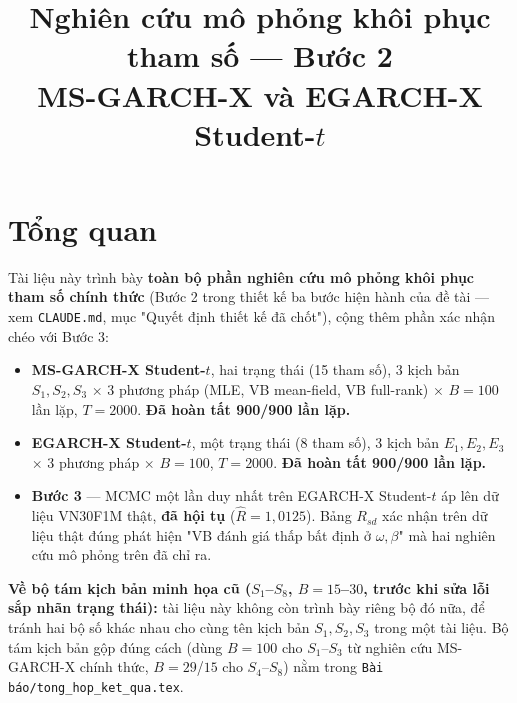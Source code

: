 \documentclass[11pt,a4paper]{article}
\title{\vspace{-1.2cm}\textbf{Nghiên cứu mô phỏng khôi phục tham số --- Bước 2}\\[0.25em]
\large MS-GARCH-X và EGARCH-X Student-$t$}
\author{}
\date{}
\begin{document}
\maketitle
\vspace{-1.4cm}

\section*{Tổng quan}
Tài liệu này trình bày \textbf{toàn bộ phần nghiên cứu mô phỏng khôi phục tham số
chính thức} (Bước 2 trong thiết kế ba bước hiện hành của đề tài --- xem
\texttt{CLAUDE.md}, mục "Quyết định thiết kế đã chốt"), cộng thêm phần xác
nhận chéo với Bước 3:

\begin{itemize}
\item \textbf{MS-GARCH-X Student-$t$}, hai trạng thái (15 tham số),
  3 kịch bản $S_1,S_2,S_3$ $\times$ 3 phương pháp (MLE, VB mean-field, VB
  full-rank) $\times$ $B=100$ lần lặp, $T=2000$. \textbf{Đã hoàn tất 900/900
  lần lặp.}
\item \textbf{EGARCH-X Student-$t$}, một trạng thái (8 tham số),
  3 kịch bản $E_1,E_2,E_3$ $\times$ 3 phương pháp $\times$ $B=100$, $T=2000$.
  \textbf{Đã hoàn tất 900/900 lần lặp.}
\item \textbf{Bước 3} --- MCMC một lần duy nhất trên EGARCH-X Student-$t$ áp
  lên dữ liệu VN30F1M thật, \textbf{đã hội tụ} ($\hat R=1{,}0125$). Bảng
  $R_{sd}$ xác nhận trên dữ liệu thật đúng phát hiện "VB đánh giá thấp bất
  định ở $\omega,\beta$" mà hai nghiên cứu mô phỏng trên đã chỉ ra.
\end{itemize}

\textbf{Về bộ tám kịch bản minh họa cũ ($S_1$--$S_8$, $B=15$--$30$, trước khi
sửa lỗi sắp nhãn trạng thái):} tài liệu này không còn trình bày riêng bộ đó
nữa, để tránh hai bộ số khác nhau cho cùng tên kịch bản $S_1,S_2,S_3$ trong
một tài liệu. Bộ tám kịch bản gộp đúng cách (dùng $B=100$ cho $S_1$--$S_3$ từ
nghiên cứu MS-GARCH-X chính thức, $B=29$/$15$ cho $S_4$--$S_8$) nằm trong
\texttt{Bài báo/tong\_hop\_ket\_qua.tex}.
\end{document}
